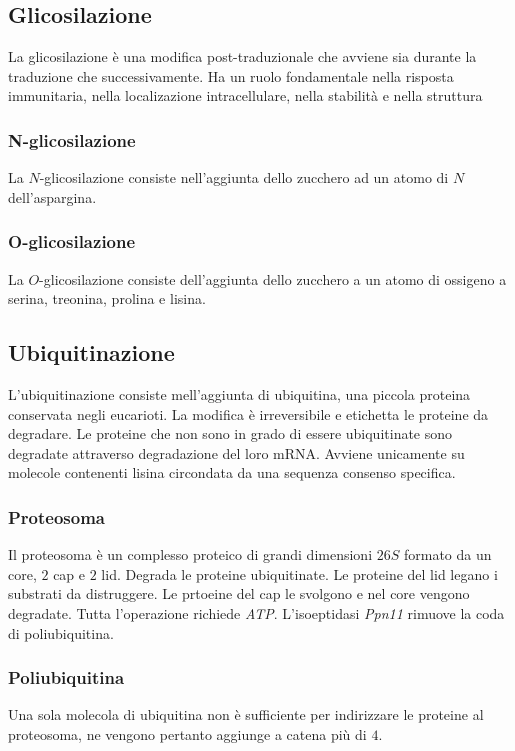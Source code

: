 	\subsection{Glicosilazione}
	La glicosilazione \`e una modifica post-traduzionale che avviene sia durante la traduzione che successivamente.
	Ha un ruolo fondamentale nella risposta immunitaria, nella localizazione intracellulare, nella stabilit\`a e nella struttura

		\subsubsection{N-glicosilazione}
		La $N$-glicosilazione consiste nell'aggiunta dello zucchero ad un atomo di $N$ dell'aspargina.

		\subsubsection{O-glicosilazione}
		La $O$-glicosilazione consiste dell'aggiunta dello zucchero a un atomo di ossigeno a serina, treonina, prolina e lisina.

	\subsection{Ubiquitinazione}
	L'ubiquitinazione consiste mell'aggiunta di ubiquitina, una piccola proteina conservata negli eucarioti.
	La modifica \`e irreversibile e etichetta le proteine da degradare.
	Le proteine che non sono in grado di essere ubiquitinate sono degradate attraverso degradazione del loro mRNA.
	Avviene unicamente su molecole contenenti lisina circondata da una sequenza consenso specifica.

		\subsubsection{Proteosoma}
		Il proteosoma \`e un complesso proteico di grandi dimensioni $26S$ formato da un core, $2$ cap e $2$ lid.
		Degrada le proteine ubiquitinate.
		Le proteine del lid legano i substrati da distruggere.
		Le prtoeine del cap le svolgono e nel core vengono degradate.
		Tutta l'operazione richiede \emph{ATP}.
		L'isoeptidasi \emph{Ppn11} rimuove la coda di poliubiquitina.

		\subsubsection{Poliubiquitina}
		Una sola molecola di ubiquitina non \`e sufficiente per indirizzare le proteine al proteosoma, ne vengono pertanto aggiunge a catena pi\`u di $4$.


